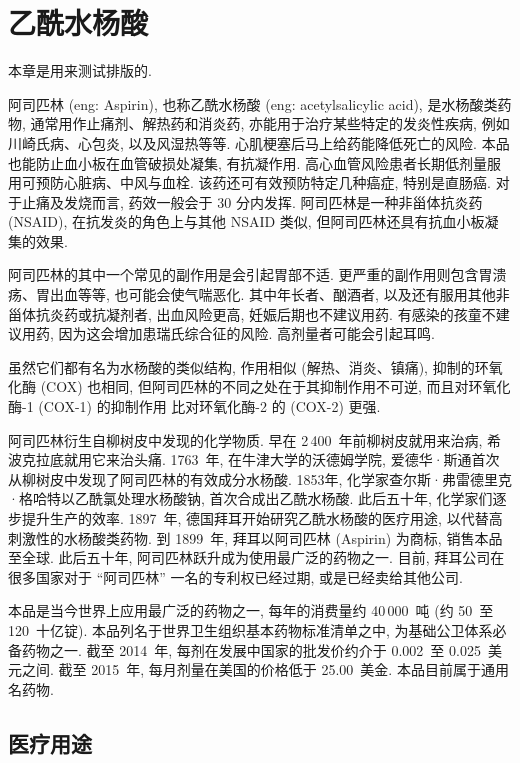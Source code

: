 \chapter{乙酰水杨酸}

\begin{remark*}
    本章是用来测试排版的.
\end{remark*}

阿司匹林 (\gls{eng}: Aspirin),
也称乙酰水杨酸 (\gls{eng}: acetylsalicylic acid),
是水杨酸类药物,
通常用作止痛剂、解热药和消炎药,
亦能用于治疗某些特定的发炎性疾病,
例如川崎氏病、心包炎, 以及风湿热等等.
心肌梗塞后马上给药能降低死亡的风险.
本品也能防止血小板在血管破损处凝集, 有抗凝作用.
高心血管风险患者长期低剂量服用可预防心脏病、中风与血栓.
该药还可有效预防特定几种癌症, 特别是直肠癌.
对于止痛及发烧而言, 药效一般会于 30 分内发挥.
阿司匹林是一种非甾体抗炎药 (NSAID),
在抗发炎的角色上与其他 NSAID 类似,
但阿司匹林还具有抗血小板凝集的效果.

阿司匹林的其中一个常见的副作用是会引起胃部不适.
更严重的副作用则包含胃溃疡、胃出血等等, 也可能会使气喘恶化.
其中年长者、酗酒者, 以及还有服用其他非甾体抗炎药或抗凝剂者,
出血风险更高, 妊娠后期也不建议用药.
有感染的孩童不建议用药, 因为这会增加患瑞氏综合征的风险.
高剂量者可能会引起耳鸣.

虽然它们都有名为水杨酸的类似结构,
作用相似 (解热、消炎、镇痛),
抑制的环氧化酶 (COX) 也相同,
但阿司匹林的不同之处在于其抑制作用不可逆,
而且对环氧化酶-1 (COX-1) 的抑制作用%
比对环氧化酶-2 的 (COX-2) 更强.

阿司匹林衍生自柳树皮中发现的化学物质.
早在 2\,400~年前柳树皮就用来治病,
希波克拉底就用它来治头痛.
1763~年, 在牛津大学的沃德姆学院,
爱德华·斯通首次从柳树皮中发现了阿司匹林的有效成分水杨酸.
1853年, 化学家查尔斯·弗雷德里克·格哈特以乙酰氯处理水杨酸钠,
首次合成出乙酰水杨酸.
此后五十年, 化学家们逐步提升生产的效率.
1897~年, 德国拜耳开始研究乙酰水杨酸的医疗用途,
以代替高刺激性的水杨酸类药物.
到 1899~年, 拜耳以阿司匹林 (Aspirin) 为商标, 销售本品至全球.
此后五十年, 阿司匹林跃升成为使用最广泛的药物之一.
目前, 拜耳公司在很多国家对于 ``阿司匹林'' 一名的专利权已经过期,
或是已经卖给其他公司.

本品是当今世界上应用最广泛的药物之一,
每年的消费量约 40\,000~吨 (约 50~至 120~十亿锭).
本品列名于世界卫生组织基本药物标准清单之中,
为基础公卫体系必备药物之一.
截至 2014~年, 每剂在发展中国家的批发价约介于
0.002~至 0.025~美元之间.
截至 2015~年, 每月剂量在美国的价格低于 25.00~美金.
本品目前属于通用名药物.

\section{医疗用途}

